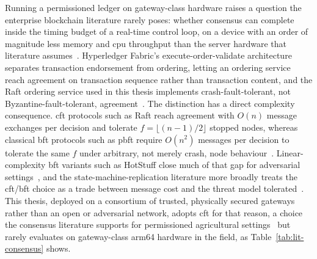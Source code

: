 \documentclass[12pt,a4paper,oneside]{book}
\begin{document}
Running a permissioned ledger on gateway-class hardware raises a question
the enterprise blockchain literature rarely poses: whether consensus can
complete inside the timing budget of a real-time control loop, on a device
with an order of magnitude less memory and \gls{cpu} throughput than the
server hardware that literature assumes~\cite{tar2023fabric,
jayaram2023hyperledger, ibmFabric}. Hyperledger Fabric's execute-order-validate
architecture separates transaction endorsement from ordering, letting an
ordering service reach agreement on transaction sequence rather than
transaction content, and the Raft ordering service used in this thesis
implements crash-fault-tolerant, not Byzantine-fault-tolerant,
agreement~\cite{ongaro2014raft, orderingServiceDoc}. The distinction has a
direct complexity consequence. \gls{cft} protocols such as Raft reach
agreement with $O(n)$ message exchanges per decision and tolerate
$f = \lfloor (n-1)/2 \rfloor$ stopped nodes, whereas classical
\gls{bft} protocols such as \gls{pbft} require $O(n^2)$ messages per
decision to tolerate the same $f$ under arbitrary,
not merely crash, node behaviour~\cite{castro1999practical,
ongaro2014raft}. Linear-complexity \gls{bft} variants such as HotStuff
close much of that gap for adversarial settings~\cite{yin2019hotstuff}, and
the state-machine-replication literature more broadly treats the
\gls{cft}/\gls{bft} choice as a trade between message cost and the
threat model tolerated~\cite{bessani2014state}. This thesis, deployed on a
consortium of trusted, physically secured gateways rather than an open or
adversarial network, adopts \gls{cft} for that reason, a choice the
consensus literature supports for permissioned agricultural
settings~\cite{dube2024fabricIrrigation} but rarely evaluates on
gateway-class \gls{arm64} hardware in the field, as
Table~\ref{tab:lit-consensus} shows.
\end{document}
